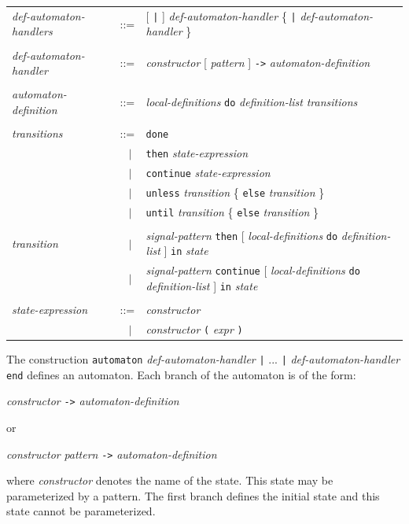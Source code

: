 \documentclass[11pt,titlepage,twoside]{report}
\newcommand{\alt}{\;|\;}
\newcommand{\Then}{\mbox{{\tt then}}}
\newcommand{\Continue}{\mbox{\tt continue}}
\newcommand{\Do}{\mbox{\tt do}}
\newcommand{\Done}{\mbox{\tt done}}
\newcommand{\term}[1]{{\tt #1}}
\newcommand{\nterm}[1]{{\em #1}}
\begin{document}
\begin{center}
\begin{tabular}{lcl}
\nterm{def-automaton-handlers}
   & ::=        & [ \term{|} ] \nterm{def-automaton-handler}
                  \{ \term{|} \nterm{def-automaton-handler} \} 
\\ \\
\nterm{def-automaton-handler}
   & ::=        & \nterm{constructor} [ \nterm{pattern} ] \term{->}
                  \nterm{automaton-definition}
\\ \\
\nterm{automaton-definition}
   & ::=        & \nterm{local-definitions}
                  \term{\Do} \nterm{definition-list} \nterm{transitions}
\\ \\
\nterm{transitions}
   & ::=        & \term{\Done} \\
   & $\;\;\alt$ & \term{\Then} \nterm{state-expression} \\
   & $\;\;\alt$ & \term{\Continue} \nterm{state-expression} \\
   & $\;\;\alt$ & \term{unless} \nterm{transition}
                     \{ \term{else} \nterm{transition} \}
\\
   & $\;\;\alt$ & \term{until} \nterm{transition}
                     \{ \term{else} \nterm{transition} \}
\\ \\
\nterm{transition}
& $\;\;\alt$ & \nterm{signal-pattern} \term{\Then}
                  [ \nterm{local-definitions} \term{do} \nterm{definition-list} ]
                  \term{in} \nterm{state}
                  \\
& $\;\;\alt$ & \nterm{signal-pattern} \term{\Continue}
                  [ \nterm{local-definitions} \term{do} \nterm{definition-list} ]
                  \term{in} \nterm{state}
\\ \\
\nterm{state-expression}
   & ::=        & \nterm{constructor} \\
   & $\;\;\alt$ & \nterm{constructor} \term{(} \nterm{expr} \term{)}
\end{tabular}
\end{center}

The construction \term{automaton} \nterm{def-automaton-handler} \term{|}
... \term{|} \nterm{def-automaton-handler} \term{end} defines an
automaton. Each branch of the automaton is of the form:
\begin{center} 
  \nterm{constructor} \term{->} \nterm{automaton-definition}
\end{center}
or
\begin{center}
  \nterm{constructor} \nterm{pattern} \term{->} \nterm{automaton-definition}
\end{center}
where \nterm{constructor} denotes the name of the state. This state
may be parameterized by a pattern.  The first branch defines the
initial state and this state cannot be parameterized.
\end{document}
